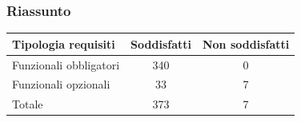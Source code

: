 \subsubsection{Riassunto}

\begin{center}
\renewcommand{\arraystretch}{1.3}
\begin{tabular}{|l|c|c|}
\hline
\rowcolor{zpusgreen!30}
\textbf{Tipologia requisiti} & \textbf{Soddisfatti} & \textbf{Non soddisfatti} \\
\hline
Funzionali obbligatori & 340 & 0 \\
\hline
Funzionali opzionali & 33 & 7 \\
\hline
Totale & 373 & 7 \\
\hline
\end{tabular}
\end{center}